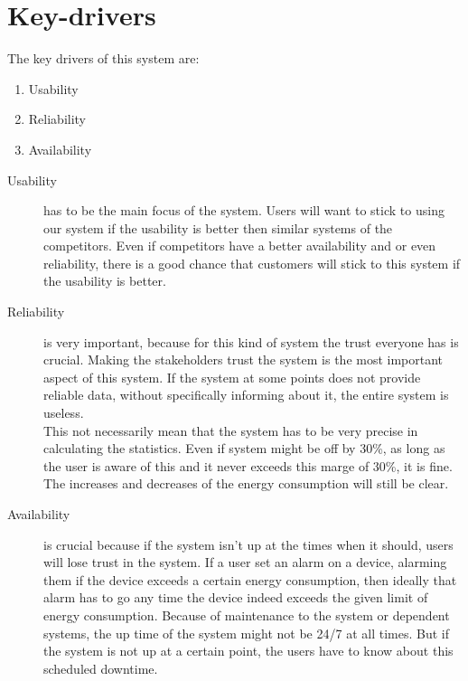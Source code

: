 \section{Key-drivers}
The key drivers of this system are:
\begin{enumerate}
\item Usability
\item Reliability
\item Availability
\end{enumerate}

\begin{description}

\item [Usability] has to be the main focus of the system. Users will want to stick to using our system if the usability is better then similar systems of the competitors. Even if competitors have a better availability and or even reliability, there is a good chance that customers will stick to this system if the usability is better. 

\item [Reliability] is very important, because for this kind of system the trust everyone has is crucial. Making the stakeholders trust the system is the most important aspect of this system. If the system at some points does not provide reliable data, without specifically informing about it, the entire system is useless.\\
This not necessarily mean that the system has to be very precise in calculating the statistics. Even if system might be off by 30\%, as long as the user is aware of this and it never exceeds this marge of 30\%, it is fine. The increases and decreases of the energy consumption will still be clear.

\item [Availability] is crucial because if the system isn't up at the times when it should, users will lose trust in the system. If a user set an alarm on a device, alarming them if the device exceeds a certain energy consumption, then ideally that alarm has to go any time the device indeed exceeds the given limit of energy consumption. Because of maintenance to the system or dependent systems, the up time of the system might not be 24/7 at all times. But if the system is not up at a certain point, the users have to know about this scheduled downtime.

\end{description}